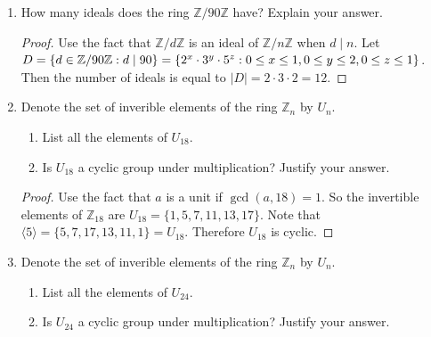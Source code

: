 \documentclass{article}
\theoremstyle{definition}
\begin{document}
\begin{enumerate}
\begin{proof}
                For (b) use the fact that $\mathbb{Z}/d\mathbb{Z}$ is an ideal of $\mathbb{Z}/n\mathbb{Z}$ when $d\mid n$. So let $D=\{d\in \mathbb{Z}/60\mathbb{Z}:d\mid 60\}=\\ \{2^x\cdot 3^y\cdot 5^z:0\leq x\leq 2, 0\leq y \leq 1, 0 \leq z \leq 1\}$. Thus the number of ideals is equal to $\mid D\mid =3\cdot 2 \cdot 2=12$
            \end{proof}

            \item How many ideals does the ring $\mathbb{Z}/90\mathbb{Z}$ have? Explain your answer.
                
            \begin{proof}
                Use the fact that $\mathbb{Z}/d\mathbb{Z}$ is an ideal of $\mathbb{Z}/n\mathbb{Z}$ when $d\mid n$. Let $D=\{d\in \mathbb{Z}/90\mathbb{Z}:d\mid 90\}= \\ \{2^x \cdot 3^y \cdot 5^z: 0\leq x \leq 1, 0\leq y \leq 2, 0\leq z \leq 1\}$. Then the number of ideals is equal to $\mid D\mid =2\cdot 3 \cdot 2=12$.
            \end{proof}

            \item Denote the set of inverible elements of the ring $\mathbb{Z}_n$ by $U_n$.
                
            \begin{enumerate}
                \item List all the elements of $U_{18}$.
                \item Is $U_{18}$ a cyclic group under multiplication? Justify your answer.
            \end{enumerate}
                
            \begin{proof}
                Use the fact that $a$ is a unit if $\gcd(a,18)=1$. So the invertible elements of $\mathbb{Z}_{18}$ are $U_{18}=\{1,5,7,11,13,17\}$. Note that $\langle 5 \rangle = \{5,7,17,13,11,1\}=U_{18}$. Therefore $U_{18}$ is cyclic.
            \end{proof}

            \item Denote the set of inverible elements of the ring $\mathbb{Z}_n$ by $U_n$.
                
            \begin{enumerate}
                \item List all the elements of $U_{24}$.
                \item Is $U_{24}$ a cyclic group under multiplication? Justify your answer.
            \end{enumerate}


\end{enumerate}
\end{document}
